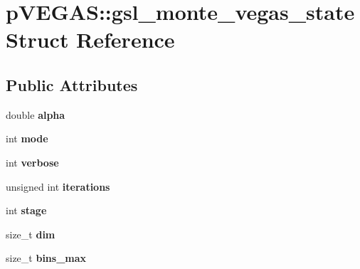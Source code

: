 \hypertarget{structpVEGAS_1_1gsl__monte__vegas__state}{\section{p\-V\-E\-G\-A\-S\-:\-:gsl\-\_\-monte\-\_\-vegas\-\_\-state Struct Reference}
\label{structpVEGAS_1_1gsl__monte__vegas__state}
}
\subsection*{Public Attributes}
\begin{DoxyCompactItemize}
\item 
\hypertarget{structpVEGAS_1_1gsl__monte__vegas__state_ad90199fbfe96d952b3ddd5d9ee50d7d6}{double {\bfseries alpha}}\label{structpVEGAS_1_1gsl__monte__vegas__state_ad90199fbfe96d952b3ddd5d9ee50d7d6}

\item 
\hypertarget{structpVEGAS_1_1gsl__monte__vegas__state_a39b883f4a437280c3e5d5b5e07f111a3}{int {\bfseries mode}}\label{structpVEGAS_1_1gsl__monte__vegas__state_a39b883f4a437280c3e5d5b5e07f111a3}

\item 
\hypertarget{structpVEGAS_1_1gsl__monte__vegas__state_acdde9366a7d66391f14c27ad0b96cafa}{int {\bfseries verbose}}\label{structpVEGAS_1_1gsl__monte__vegas__state_acdde9366a7d66391f14c27ad0b96cafa}

\item 
\hypertarget{structpVEGAS_1_1gsl__monte__vegas__state_a5f12f3e4474770bbb6e1d0256e872b09}{unsigned int {\bfseries iterations}}\label{structpVEGAS_1_1gsl__monte__vegas__state_a5f12f3e4474770bbb6e1d0256e872b09}

\item 
\hypertarget{structpVEGAS_1_1gsl__monte__vegas__state_aee953f39aec5f8650863d3cc43efe111}{int {\bfseries stage}}\label{structpVEGAS_1_1gsl__monte__vegas__state_aee953f39aec5f8650863d3cc43efe111}

\item 
\hypertarget{structpVEGAS_1_1gsl__monte__vegas__state_a26732c04d9dbe43bc7421866cb5990c7}{size\-\_\-t {\bfseries dim}}\label{structpVEGAS_1_1gsl__monte__vegas__state_a26732c04d9dbe43bc7421866cb5990c7}

\item 
\hypertarget{structpVEGAS_1_1gsl__monte__vegas__state_a92f422cf2d6586001d785c674cc00bb7}{size\-\_\-t {\bfseries bins\-\_\-max}}\label{structpVEGAS_1_1gsl__monte__vegas__state_a92f422cf2d6586001d785c674cc00bb7}


\end{DoxyCompactItemize}
